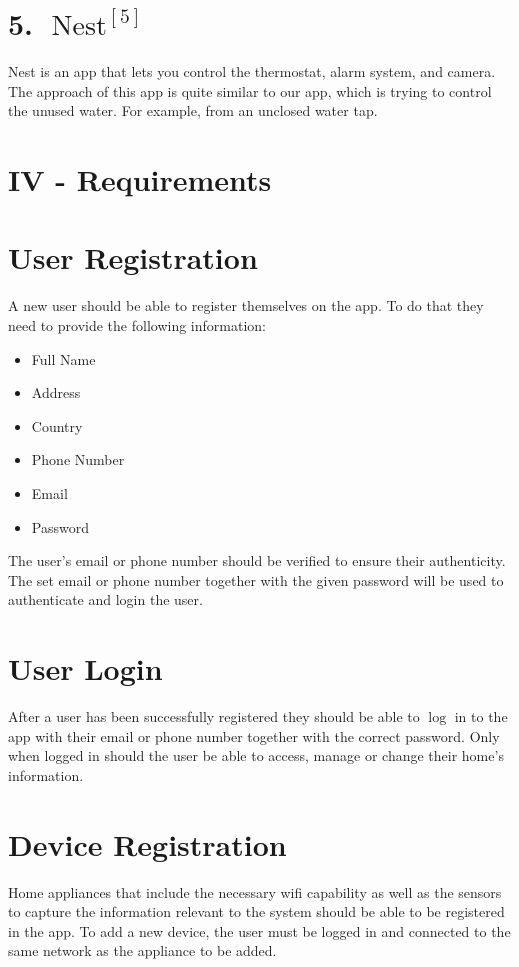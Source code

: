 \documentclass[10pt]{article}
\begin{document}
\section{5. $\operatorname{Nest}^{[5]}$}
Nest is an app that lets you control the thermostat, alarm system, and camera. The approach of this app is quite similar to our app, which is trying to control the unused water. For example, from an unclosed water tap.

\section{IV - Requirements}
\section{User Registration}
A new user should be able to register themselves on the app. To do that they need to provide the following information:

\begin{itemize}
  \item Full Name

  \item Address

  \item Country

  \item Phone Number

  \item Email

  \item Password

\end{itemize}

The user's email or phone number should be verified to ensure their authenticity. The set email or phone number together with the given password will be used to authenticate and login the user.

\section{User Login}
After a user has been successfully registered they should be able to $\log$ in to the app with their email or phone number together with the correct password. Only when logged in should the user be able to access, manage or change their home's information.

\section{Device Registration}
Home appliances that include the necessary wifi capability as well as the sensors to capture the information relevant to the system should be able to be registered in the app. To add a new device, the user must be logged in and connected to the same network as the appliance to be added.
\end{document}
